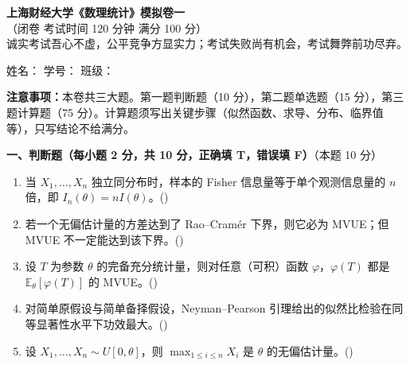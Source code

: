 \documentclass[12pt,a4paper]{ctexart}
\newcommand{\question}[2]{\bigskip\noindent\textbf{#1}\quad（本题 #2 分）\par\nobreak\medskip}
\newcommand{\E}{\mathbb{E}}
\begin{document}
\begin{center}
  {\LARGE\bfseries 上海财经大学《数理统计》模拟卷一}\\[2mm]
  {\small（闭卷 \quad 考试时间 120 分钟 \quad 满分 100 分）}\\[1mm]
  {\small 诚实考试吾心不虚，公平竞争方显实力；考试失败尚有机会，考试舞弊前功尽弃。}
\end{center}

\vspace{2mm}
\noindent
姓名：\underline{\hspace{3.0cm}}\hfill
学号：\underline{\hspace{3.0cm}}\hfill
班级：\underline{\hspace{3.0cm}}

\vspace{1mm}


\vspace{1mm}
\noindent\textbf{注意事项：}本卷共三大题。第一题判断题（10 分），第二题单选题（15 分），第三题计算题（75 分）。计算题须写出关键步骤（似然函数、求导、分布、临界值等），只写结论不给满分。

\question{一、判断题（每小题 2 分，共 10 分，正确填 T，错误填 F）}{10}
\begin{enumerate}[label=\arabic*.,leftmargin=2.0em]
  \item 当 $X_1,\dots,X_n$ 独立同分布时，样本的 Fisher 信息量等于单个观测信息量的 $n$ 倍，即 $I_n(\theta)=nI(\theta)$。\hfill(\underline{\hspace{1.2cm}})
  \item 若一个无偏估计量的方差达到了 Rao--Cramér 下界，则它必为 MVUE；但 MVUE 不一定能达到该下界。\hfill(\underline{\hspace{1.2cm}})
  \item 设 $T$ 为参数 $\theta$ 的完备充分统计量，则对任意（可积）函数 $\varphi$，$\varphi(T)$ 都是 $\E_\theta[\varphi(T)]$ 的 MVUE。\hfill(\underline{\hspace{1.2cm}})
  \item 对简单原假设与简单备择假设，Neyman--Pearson 引理给出的似然比检验在同等显著性水平下功效最大。\hfill(\underline{\hspace{1.2cm}})
  \item 设 $X_1,\dots,X_n\sim U[0,\theta]$，则 $\max_{1\le i\le n}X_i$ 是 $\theta$ 的无偏估计量。\hfill(\underline{\hspace{1.2cm}})
\end{enumerate}
\end{document}
